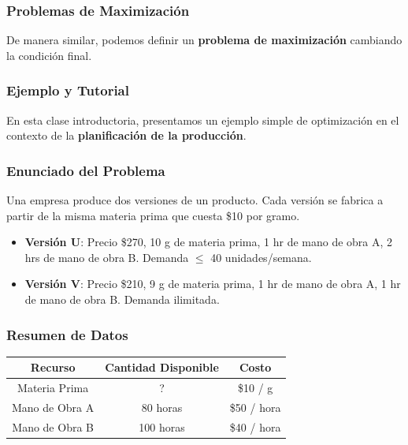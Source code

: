 \documentclass{beamer}
\begin{document}
\begin{frame}
\frametitle{Problemas de Maximización}
De manera similar, podemos definir un \textbf{problema de maximización} cambiando la condición final.
\end{frame}

\begin{frame}
\frametitle{Ejemplo y Tutorial}
En esta clase introductoria, presentamos un ejemplo simple de optimización en el contexto de la \textbf{planificación de la producción}.
\end{frame}

\begin{frame}
\frametitle{Enunciado del Problema}
Una empresa produce dos versiones de un producto. Cada versión se fabrica a partir de la misma materia prima que cuesta \$10 por gramo.
\begin{itemize}
    \item \textbf{Versión U}: Precio \$270, 10 g de materia prima, 1 hr de mano de obra A, 2 hrs de mano de obra B. Demanda $\leq$ 40 unidades/semana.
    \item \textbf{Versión V}: Precio \$210, 9 g de materia prima, 1 hr de mano de obra A, 1 hr de mano de obra B. Demanda ilimitada.
\end{itemize}
\end{frame}

\begin{frame}
\frametitle{Resumen de Datos}
\centering
{}

\centering
\begin{tabular}{|c|c|c|}
\hline
\textbf{Recurso} & \textbf{Cantidad Disponible} & \textbf{Costo} \\
\hline
Materia Prima & ? & \$10 / g \\
\hline
Mano de Obra A & 80 horas & \$50 / hora \\
\hline
Mano de Obra B & 100 horas & \$40 / hora \\
\hline
\end{tabular}
\end{frame}
\end{document}
